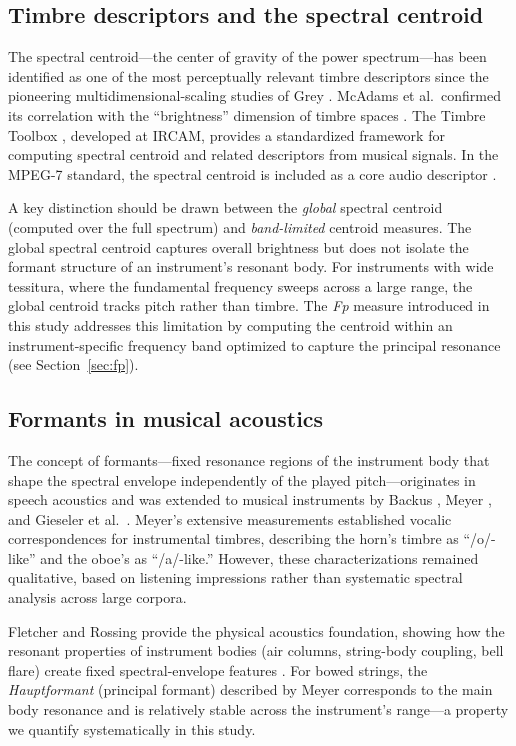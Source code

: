 \documentclass[12pt,a4paper]{article}
\begin{document}
\subsection{Timbre descriptors and the spectral centroid}

The spectral centroid---the center of gravity of the power spectrum---has been
identified as one of the most perceptually relevant timbre descriptors since the
pioneering multidimensional-scaling studies of Grey \citep{Grey1977}. McAdams
et al.\ confirmed its correlation with the ``brightness'' dimension of timbre
spaces \citep{McAdams1995}. The Timbre Toolbox \citep{Peeters2011}, developed
at IRCAM, provides a standardized framework for computing spectral centroid and
related descriptors from musical signals. In the MPEG-7 standard, the spectral
centroid is included as a core audio descriptor \citep{MPEG7}.

A key distinction should be drawn between the \emph{global} spectral centroid
(computed over the full spectrum) and \emph{band-limited} centroid measures. The
global spectral centroid captures overall brightness but does not isolate the
formant structure of an instrument's resonant body. For instruments with wide
tessitura, where the fundamental frequency sweeps across a large range, the
global centroid tracks pitch rather than timbre. The \textit{Fp} measure
introduced in this study addresses this limitation by computing the centroid
within an instrument-specific frequency band optimized to capture the principal
resonance (see Section~\ref{sec:fp}).

\subsection{Formants in musical acoustics}

The concept of formants---fixed resonance regions of the instrument body that
shape the spectral envelope independently of the played pitch---originates in
speech acoustics \citep{Fant1960} and was extended to musical instruments by
Backus \citep{Backus1969}, Meyer \citep{Meyer2009}, and Gieseler et al.\
\citep{Gieseler1985}. Meyer's extensive measurements established vocalic
correspondences for instrumental timbres, describing the horn's timbre as
``/o/-like'' and the oboe's as ``/a/-like.'' However, these characterizations
remained qualitative, based on listening impressions rather than systematic
spectral analysis across large corpora.

Fletcher and Rossing provide the physical acoustics foundation, showing how the
resonant properties of instrument bodies (air columns, string-body coupling,
bell flare) create fixed spectral-envelope features \citep{Fletcher1998}. For
bowed strings, the \emph{Hauptformant} (principal formant) described by Meyer
corresponds to the main body resonance and is relatively stable across the
instrument's range---a property we quantify systematically in this study.
\end{document}
